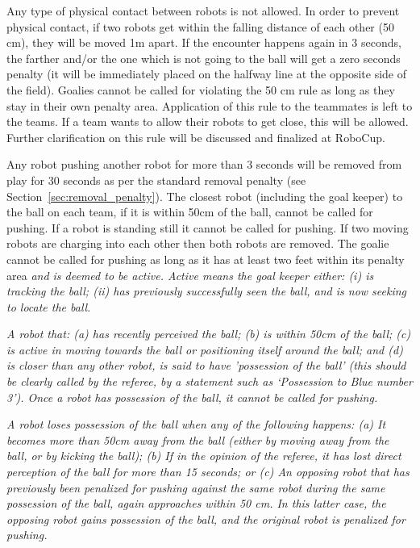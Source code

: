 \documentclass[12pt]{article}
\begin{document}
Any type of physical contact between robots is not allowed. In order to prevent physical contact, if two robots get within the falling distance of each other (50 cm), they will be moved 1m apart. If the encounter happens again in 3 seconds, the farther and/or the one which is not going to the ball will get a zero seconds penalty (it will be immediately placed on the halfway line at the opposite side of the field). Goalies cannot be called for violating the 50 cm rule as long as they stay in their own penalty area. Application of this rule to the teammates is left to the teams.  If a team wants to allow their robots to get close, this will be allowed. Further clarification on this rule will be discussed and finalized at RoboCup. 


%

Any robot pushing another robot for more than 3 seconds will be
removed from play for 30 seconds as per the standard removal penalty
(see Section~\ref{sec:removal_penalty}).  The closest robot
(including the goal keeper) to the ball on each team, if it is
within 50cm of the ball, cannot be called for pushing.  If
a robot is standing still it cannot be called for pushing.  If two
moving robots are charging into each other then both robots are
removed. The goalie cannot be called for pushing as long as it has
at least two feet within its penalty area
\emph{and is deemed to be active. Active means the goal keeper either:
(i) is tracking the ball; (ii) has previously successfully seen the ball, and is now seeking to
locate the ball}.

\emph{A robot that: (a) has recently perceived the ball; (b) is within 50cm of the ball; (c) is active in moving towards the ball or positioning itself around the ball; and (d) is closer than any other robot, is said to have 'possession of the ball' (this should be clearly called by the referee, by a statement such as `Possession to Blue number 3'). Once a robot has possession of the ball, it cannot be called for pushing.}

\emph{A robot loses possession of the ball when any of the following happens: (a) It becomes more than 50cm away from the ball (either by moving away from the ball, or by kicking the ball); (b) If in the opinion of the referee, it has lost direct perception of the ball for more than 15 seconds; or (c) An opposing robot that has previously been penalized for pushing against the same robot during the same possession of the ball, again approaches within 50 cm. In this latter case, the opposing robot gains possession of the ball, and the original robot is penalized for pushing.}
\end{document}
